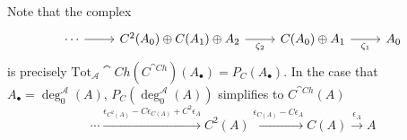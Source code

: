 Note that the complex 
\[\begin{tikzcd}
	\cdots & {C^2(A_0)\oplus C(A_1)\oplus A_2} & {C(A_0)\oplus A_1} & {A_0}
	\arrow["{\zeta_2}"', from=1-2, to=1-3]
	\arrow["{\zeta_1}"', from=1-3, to=1-4]
	\arrow[from=1-1, to=1-2]
\end{tikzcd}\]
is precisely $\text{Tot}_\mathcal{A}\cat{Ch}(C^{\cat{Ch}})(A_\bullet) = P_C(A_\bullet)$. In the case that $A_\bullet = \deg_0^\mathcal{A}(A)$, $P_C(\deg_0^\mathcal{A}(A))$ simplifies to $C^{\cat{Ch}}(A)$
\begin{equation*}
	\cdots \xrightarrow{\epsilon_{C^2(A)}-C\epsilon_{C(A)}+C^2\epsilon_{A}} C^2(A)\xrightarrow{\epsilon_{C(A)}-C\epsilon_A}C(A)\xrightarrow{\epsilon_A}A
\end{equation*}

\vspace{10pt}

